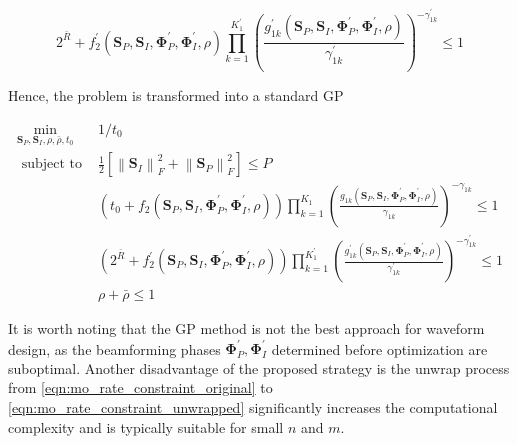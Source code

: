 \begin{equation}\label{eqn:mo_rate_constraint_standard}
  {2^{\bar R}} + f_2^\prime \left( {{{\mathbf{S}}_P},{{\mathbf{S}}_I},{\mathbf{\Phi }}_P^\prime ,{\mathbf{\Phi }}_I^\prime ,\rho } \right)\prod\limits_{k = 1}^{K_1^\prime } {{{\left( {\frac{{g_{1k}^\prime \left( {{{\mathbf{S}}_P},{{\mathbf{S}}_I},{\mathbf{\Phi }}_P^\prime ,{\mathbf{\Phi }}_I^\prime ,\rho } \right)}}{{\gamma _{1k}^\prime }}} \right)}^{ - \gamma _{1k}^\prime }}}  \leqslant 1
\end{equation}

Hence, the problem is transformed into a standard GP

\begin{eqnarray}
  {\mathop {\min }\limits_{{{\mathbf{S}}_P},{{\mathbf{S}}_I},\rho ,\bar \rho ,{t_0}} }&{1/{t_0}} \label{eqn:mo_target} \\
  {{\text{ subject to }}}&{\frac{1}{2}\left[ {\left\| {{{\mathbf{S}}_I}} \right\|_F^2 + \left\| {{{\mathbf{S}}_P}} \right\|_F^2} \right] \leqslant P} \label{eqn:mo_power_constraint} \\
  {}&{\left( {{t_0} + {f_2}\left( {{{\mathbf{S}}_P},{{\mathbf{S}}_I},{\mathbf{\Phi }}_P^\prime ,{\mathbf{\Phi }}_I^\prime ,\rho } \right)} \right)\prod\limits_{k = 1}^{{K_1}} {{{\left( {\frac{{{g_{1k}}\left( {{{\mathbf{S}}_P},{{\mathbf{S}}_I},{\mathbf{\Phi }}_P^\prime ,{\mathbf{\Phi }}_I^\prime ,\rho } \right)}}{{{\gamma _{1k}}}}} \right)}^{ - {\gamma _{1k}}}}}  \leqslant 1} \label{eqn:mo_current_constraint} \\
  {}&{\left( {{2^{\bar R}} + f_2^\prime \left( {{{\mathbf{S}}_P},{{\mathbf{S}}_I},{\mathbf{\Phi }}_P^\prime ,{\mathbf{\Phi }}_I^\prime ,\rho } \right)} \right)\prod\limits_{k = 1}^{K_1^\prime } {{{\left( {\frac{{g_{1k}^\prime \left( {{{\mathbf{S}}_P},{{\mathbf{S}}_I},{\mathbf{\Phi }}_P^\prime ,{\mathbf{\Phi }}_I^\prime ,\rho } \right)}}{{\gamma _{1k}^\prime }}} \right)}^{ - \gamma _{1k}^\prime }}}  \leqslant 1} \label{eqn:mo_rate_constraint} \\
  {}&{\rho  + \bar \rho  \leqslant 1 \label{eqn:mo_ratio_constraint}}
\end{eqnarray}

It is worth noting that the GP method is not the best approach for waveform design, as the beamforming phases ${\mathbf{\Phi }}_P^\prime ,{\mathbf{\Phi }}_I^\prime $ determined before optimization are suboptimal. Another disadvantage of the proposed strategy is the unwrap process from \ref{eqn:mo_rate_constraint_original} to \ref{eqn:mo_rate_constraint_unwrapped} significantly increases the computational complexity and is typically suitable for small $n$ and $m$. 